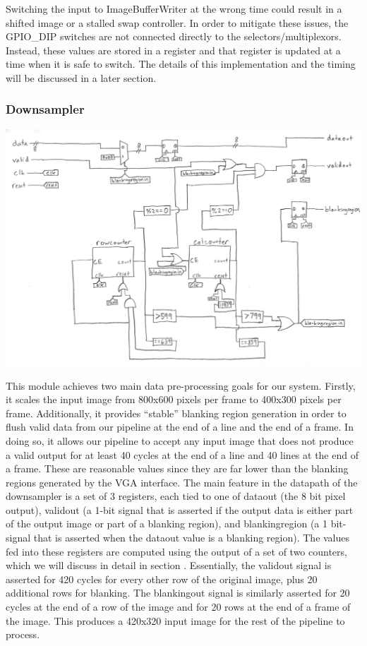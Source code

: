 \documentclass[12pt]{article}
\begin{document}
Switching the input to ImageBufferWriter at the wrong time could result in 
a shifted image or a stalled swap controller. In order to mitigate these issues, 
the GPIO\_DIP switches are not connected directly to the selectors/multiplexors. 
Instead, these values are stored in a register and that register is updated at 
a time when it is safe to switch. The details of this implementation and the 
timing will be discussed in a later section.


\subsubsection{Downsampler}

\includegraphics[width=\textwidth]{processed_image_pngs/Downsampler.png}

This module achieves two main data pre-processing goals for our system. Firstly,
it scales the input image from 800x600 pixels per frame to 400x300 pixels per frame.
Additionally, it provides ``stable'' blanking region generation in order to 
flush valid data from our pipeline at the end of a line and the end of a frame.
In doing so, it allows our pipeline to accept any input image that does not 
produce a valid output for at least 40 cycles at the end of a line and 40 lines
at the end of a frame. These are reasonable values since they are far lower than
the blanking regions generated by the VGA interface. The main feature in the
datapath of the downsampler is a set of 3 registers, each tied to one of 
dataout (the 8 bit pixel output), validout (a 1-bit signal that is asserted if
the output data is either part of the output image or part of a blanking region), 
and blankingregion (a 1 bit-signal that is asserted when the dataout value is
a blanking region). The values fed into these registers are computed using 
the output of a set of two counters, which we will discuss in detail in section 
. Essentially, the validout signal is asserted for 420 cycles for every other row 
of the original image, plus 20 additional rows for blanking. The blankingout signal
is similarly asserted for 20 cycles at the end of a row of the image and for
20 rows at the end of a frame of the image. This produces a 420x320 input image
for the rest of the pipeline to process.
\end{document}

